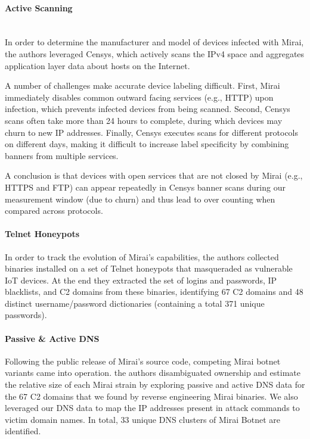 \documentclass[conference]{IEEEtran}
\begin{document}
\paragraph{\textbf{Active Scanning}}\\
In order to determine the
manufacturer and model of devices infected with Mirai,
the authors \cite{b1} leveraged Censys, which actively scans the IPv4
space and aggregates application layer data about hosts on
the Internet.

A number of challenges make accurate device labeling
difficult. First, Mirai immediately disables common outward
facing services (e.g., HTTP) upon infection, which
prevents infected devices from being scanned. Second,
Censys scans often take more than 24 hours to complete,
during which devices may churn to new IP addresses. Finally,
Censys executes scans for different protocols on
different days, making it difficult to increase label specificity
by combining banners from multiple services. 

A conclusion is that devices with open
services that are not closed by Mirai (e.g., HTTPS and
FTP) can appear repeatedly in Censys banner scans during
our measurement window (due to churn) and thus lead to
over counting when compared across protocols. 
\paragraph{\textbf{Telnet Honeypots}}
In order to track the evolution of Mirai’s capabilities, the authors \cite{b1}  collected
binaries installed on a set of Telnet honeypots that masqueraded
as vulnerable IoT devices. At the end they extracted
the set of logins and passwords, IP blacklists, and C2 domains
from these binaries, identifying 67 C2 domains and
48 distinct username/password dictionaries (containing a
total 371 unique passwords).
\paragraph{\textbf{Passive \& Active DNS}}
Following the public release of Mirai’s source code, competing
Mirai botnet variants came into operation.  the authors \cite{b1}
disambiguated ownership and estimate the relative size
of each Mirai strain by exploring passive and active DNS
data for the 67 C2 domains that we found by reverse engineering
Mirai binaries. We also leveraged our DNS data
to map the IP addresses present in attack commands to
victim domain names. In total,  33 unique DNS
clusters of Mirai Botnet are identified.
\end{document}
